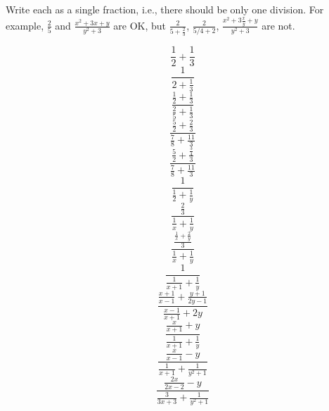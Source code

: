 \documentclass[twocolumn,12pt]{report}
\begin{document}
Write each as a single fraction, i.e., there should be only one division.
For example, $\frac{2}{5}$ and $\frac{x^2 + 3x + y}{y^2 + 3}$ are OK, but
$\frac{2}{5 + \frac{2}{3}}$,
$\frac{2}{5/4 + 2}$,
$\frac{x^2 + 3\frac{x}{y} + y}{y^2 + 3}$
are not.


\[ \frac{1}{2} + \frac{1}{3} \]
\[ \frac{1}{{2} + \frac{1}{3}} \]
\[ \frac{\frac{1}{2} + \frac{1}{3}}{\frac{2}{5} + \frac{1}{3}} \]
\[ \frac{\frac{5}{2} + \frac{2}{3}}{\frac{7}{8} + \frac{11}{3}} \]
\[ \frac{\frac{5}{2} + \frac{\frac{3}{4}}{3}}{\frac{7}{8} + \frac{11}{3}} \]
\[ \frac{1}{\frac{1}{2} + \frac{1}{y}} \]
\[ \frac{\frac{2}{3}}{\frac{1}{x} + \frac{1}{y}} \]
\[ \frac{\frac{\frac{1}{x} + \frac{2}{y}}{3}}{\frac{1}{x} + \frac{1}{y}} \]
\[ \frac{1}{\frac{1}{x+1} + \frac{1}{y}} \]
\[ \frac{\frac{x+1}{x-1} + \frac{y+1}{2y-1}}{\frac{x-1}{x+1} + 2y} \]
\[ \frac{\frac{x}{x+1} + y}{\frac{1}{x+1} + \frac{1}{y}} \]
\[ \frac{\frac{x}{x-1} - y}{\frac{1}{x+1} + \frac{1}{y^2 + 1}} \]
\[ \frac{\frac{2x}{2x-2} - y}{\frac{3}{3x+3} + \frac{1}{y^2 + 1}} \]
\end{document}
